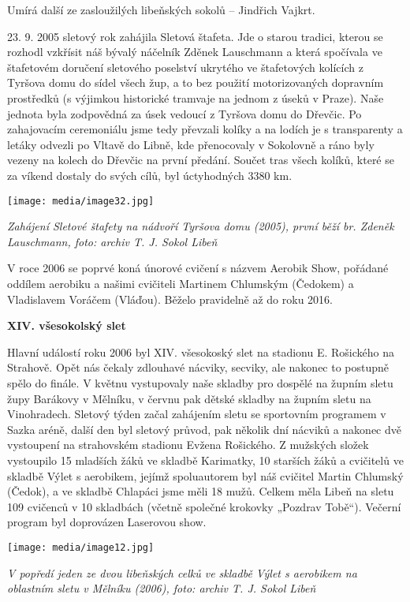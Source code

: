 Umírá další ze zasloužilých libeňských sokolů -- Jindřich Vajkrt.

23. 9. 2005 sletový rok zahájila Sletová štafeta. Jde o starou tradici,
kterou se rozhodl vzkřísit náš bývalý náčelník Zděnek Lauschmann a která
spočívala ve štafetovém doručení sletového poselství ukrytého ve
štafetových kolících z Tyršova domu do sídel všech žup, a to bez použití
motorizovaných dopravním prostředků (s výjimkou historické tramvaje na
jednom z úseků v Praze). Naše jednota byla zodpovědná za úsek vedoucí z
Tyršova domu do Dřevčic. Po zahajovacím ceremoniálu jsme tedy převzali
kolíky a na lodích je s transparenty a letáky odvezli po Vltavě do
Libně, kde přenocovaly v Sokolovně a ráno byly vezeny na kolech do
Dřevčic na první předání. Součet tras všech kolíků, které se za víkend
dostaly do svých cílů, byl úctyhodných 3380 km.

\texttt{[image: media/image32.jpg]}

\emph{Zahájení Sletové štafety na nádvoří Tyršova domu (2005), první
běží br. Zdeněk Lauschmann, foto: archiv T. J. Sokol Libeň}

V roce 2006 se poprvé koná únorové cvičení s názvem Aerobik Show,
pořádané oddílem aerobiku a našimi cvičiteli Martinem Chlumským
(Čedokem) a Vladislavem Voráčem (Vláďou). Běželo pravidelně až do roku
2016.

\textbf{XIV. všesokolský slet}

Hlavní událostí roku 2006 byl XIV. všesokoský slet na stadionu E.
Rošického na Strahově. Opět nás čekaly zdlouhavé nácviky, secviky, ale
nakonec to postupně spělo do finále. V květnu vystupovaly naše skladby
pro dospělé na župním sletu župy Barákovy v Mělníku, v červnu pak dětské
skladby na župním sletu na Vinohradech. Sletový týden začal zahájením
sletu se sportovním programem v Sazka aréně, další den byl sletový
průvod, pak několik dní nácviků a nakonec dvě vystoupení na strahovském
stadionu Evžena Rošického. Z mužských složek vystoupilo 15 mladších žáků
ve skladbě Karimatky, 10 starších žáků a cvičitelů ve skladbě Výlet s
aerobikem, jejímž spoluautorem byl náš cvičitel Martin Chlumský (Čedok),
a ve skladbě Chlapáci jsme měli 18 mužů. Celkem měla Libeň na sletu 109
cvičenců v 10 skladbách (včetně společné krokovky „Pozdrav Tobě``).
Večerní program byl doprovázen Laserovou show.

\texttt{[image: media/image12.jpg]}

\emph{V popředí jeden ze dvou libeňských celků ve skladbě Výlet s
aerobikem na oblastním sletu v Mělníku (2006), foto: archiv T. J. Sokol
Libeň}

